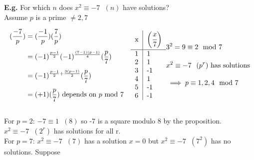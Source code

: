\documentclass[11pt]{article}
\begin{document}
\textbf{E.g.} For which $n$ does $x^2 \equiv -7\hspace{7pt}  (n)$ have solutions?\\[1em]
Assume $p$ is a prime $\neq 2, 7$



\begin{align*}
	\begin{split}
		(\frac{-7}{p}) &= (\frac{-1}{p}) (\frac{7}{p})\\[0.5em]
		&= (-1)^{\frac{p-1}{2}}(-1)^{\frac{(7-1)(p-1)}{4}} (\frac{p}{7})\\[0.5em]
		&= (-1)^{\frac{p-1}{2} + \frac{3(p-1)}{2}} (\frac{p}{7})\\[0.5em]
		&= (+1) (\frac{p}{7}) \text{ depends on $p$ mod 7}
	\end{split}&&
	\begin{tabular}{l|l}
		\multicolumn{1}{l|}{x} & \multicolumn{1}{l}{$\bigg(\cfrac{x}{7}\bigg)$} \\[0.8em] \hline
	1 & 1 \\ 
	2 & 1 \\ 
	3 & -1\\
	4 & 1 \\
	5 & -1\\
	6 & -1\\                 
	\end{tabular}
	\begin{split}
		&3^2 = 9 \equiv 2 \mod 7 \\[1em]
		&x^2 \equiv -7 \hspace{7pt} (p^r) \text{ has solutions}\\[1em]
		&\implies p \equiv 1,2,4 \mod 7
	\end{split}
\end{align*}
	\\[1em]
For $p=2$:  $-7 \equiv 1 \hspace{7pt} (8)$ so -7 is a square modulo 8 by the proposition.\\
 \hspace{53pt}$x^2 \equiv -7\hspace{7pt} (2^r)$ has solutions for all r. \\[1em]

 For $p=7$: $x^2 \equiv -7 \hspace{7pt} (7)$ has a solution $x=0$ but $x^2 \equiv -7 \hspace{7pt} (7^2)$ has no solutions. Suppose 
\end{document}
